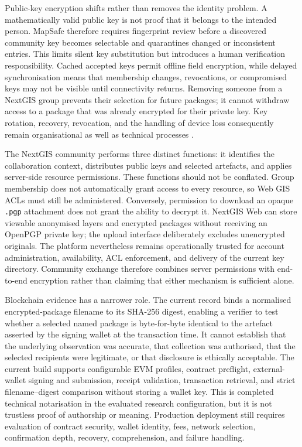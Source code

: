 \documentclass[a4paper,UKenglish,cleveref,autoref,thm-restate]{lipics-v2021}
\begin{document}
Public-key encryption shifts rather than removes the identity problem. A mathematically valid public key is not proof that it belongs to the intended person. MapSafe therefore requires fingerprint review before a discovered community key becomes selectable and quarantines changed or inconsistent entries. This limits silent key substitution but introduces a human verification responsibility. Cached accepted keys permit offline field encryption, while delayed synchronisation means that membership changes, revocations, or compromised keys may not be visible until connectivity returns. Removing someone from a NextGIS group prevents their selection for future packages; it cannot withdraw access to a package that was already encrypted for their private key. Key rotation, recovery, revocation, and the handling of device loss consequently remain organisational as well as technical processes \citep{chu2013key,zhang2010wireless,wouters2024openpgp}.

The NextGIS community performs three distinct functions: it identifies the collaboration context, distributes public keys and selected artefacts, and applies server-side resource permissions. These functions should not be conflated. Group membership does not automatically grant access to every resource, so Web GIS ACLs must still be administered. Conversely, permission to download an opaque \texttt{.pgp} attachment does not grant the ability to decrypt it. NextGIS Web can store viewable anonymised layers and encrypted packages without receiving an OpenPGP private key; the upload interface deliberately excludes unencrypted originals. The platform nevertheless remains operationally trusted for account administration, availability, ACL enforcement, and delivery of the current key directory. Community exchange therefore combines server permissions with end-to-end encryption rather than claiming that either mechanism is sufficient alone.

Blockchain evidence has a narrower role. The current record binds a normalised encrypted-package filename to its SHA-256 digest, enabling a verifier to test whether a selected named package is byte-for-byte identical to the artefact asserted by the signing wallet at the transaction time. It cannot establish that the underlying observation was accurate, that collection was authorised, that the selected recipients were legitimate, or that disclosure is ethically acceptable. The current build supports configurable EVM profiles, contract preflight, external-wallet signing and submission, receipt validation, transaction retrieval, and strict filename--digest comparison without storing a wallet key. This is completed technical notarisation in the evaluated research configuration, but it is not trustless proof of authorship or meaning. Production deployment still requires evaluation of contract security, wallet identity, fees, network selection, confirmation depth, recovery, comprehension, and failure handling.
\end{document}
